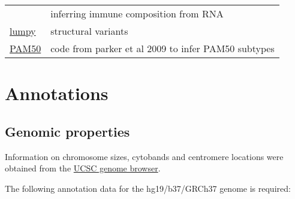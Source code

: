 \documentclass[
]{book}
\begin{document}
\begin{longtable}[]{@{}ll@{}}
\begin{minipage}[t]{0.10\columnwidth}
\end{minipage} & \begin{minipage}[t]{0.85\columnwidth}\raggedright
inferring immune composition from RNA\strut
\end{minipage}\tabularnewline
\begin{minipage}[t]{0.10\columnwidth}\raggedright
\href{https://github.com/arq5x/lumpy-sv}{lumpy}\strut
\end{minipage} & \begin{minipage}[t]{0.85\columnwidth}\raggedright
structural variants\strut
\end{minipage}\tabularnewline
\begin{minipage}[t]{0.10\columnwidth}\raggedright
\href{https://genome.unc.edu/pubsup/breastGEO/PAM50.zip}{PAM50}\strut
\end{minipage} & \begin{minipage}[t]{0.85\columnwidth}\raggedright
code from parker et al 2009 to infer PAM50 subtypes\strut
\end{minipage}\tabularnewline
\bottomrule
\end{longtable}

\hypertarget{annotations}{%
\section{Annotations}\label{annotations}}

\hypertarget{genomic-properties}{%
\subsection{Genomic properties}\label{genomic-properties}}

Information on chromosome sizes, cytobands and centromere locations were obtained from the \href{http://hgdownload.soe.ucsc.edu/goldenPath/rn6/database/}{UCSC genome browser}.

The following annotation data for the hg19/b37/GRCh37 genome is required:
\end{document}
